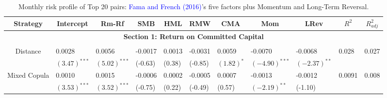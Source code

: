 \documentclass[a4paper]{article}
\begin{document}
		\begin{table}[!ht]
		\centering \scriptsize
		\caption{Monthly risk profile of Top 20 pairs: \textcolor{blue}{Fama and French} \textcolor{blue}{(2016)}'s five factors plus Momentum and Long-Term Reversal.}
		\begin{threeparttable}[H]
			\begin{tabularx}{\textwidth}{@{\extracolsep{\fill}} lllllllllll@{}}
				\toprule
				\multicolumn{1}{c}{Strategy} & \multicolumn{1}{c}{Intercept} &  \multicolumn{1}{c}{Rm-Rf} &  \multicolumn{1}{c}{SMB} &  \multicolumn{1}{c}{HML} &  \multicolumn{1}{c}{RMW} &  \multicolumn{1}{c}{CMA} & 
				\multicolumn{1}{c}{Mom} &  \multicolumn{1}{c}{LRev} &  \multicolumn{1}{c}{$R^{2}$} & \multicolumn{1}{c}{$R^{2}_{adj}$} \\
				\midrule
				\multicolumn{11}{c}{\textbf{Section 1: Return on Committed Capital}} \\
				\multicolumn{1}{c}{} & \multicolumn{1}{c}{} & \multicolumn{1}{c}{} & \multicolumn{1}{c}{} & \multicolumn{1}{c}{} & \multicolumn{1}{c}{} & \multicolumn{1}{c}{} & \multicolumn{1}{c}{} & \multicolumn{1}{c}{} & \multicolumn{1}{c}{} & \\
				\multicolumn{1}{c}{Distance} & 0.0028 & 0.0056 & -0.0017 & 0.0013 & -0.0031 & 0.0059 & -0.0070 & -0.0068 & 0.028 & 0.027 \\
				\multicolumn{1}{c}{} & $(3.47)^{***}$ & $(5.02)^{***}$ & (-0.63) & (0.38) & (-0.85) & $(1.82)^{*}$ & $(-4.90)^{***}$ & $(-2.37)^{**}$ & & \\
				\multicolumn{1}{c}{Mixed Copula} & 0.0010 & 0.0015 & -0.0006 & 0.0002 & -0.0005 & 0.0007 & -0.0013 & -0.0012 & 0.0091 & 0.008 \\
				\multicolumn{1}{c}{} & $(3.53)^{***}$ & $(3.52)^{***}$ & (-0.75) & (0.22) & (-0.49) & (0.57) & $(-2.19)^{**}$ & (-1.10) & & \\
				

\end{tabularx}
\end{threeparttable}
\end{table}
\end{document}
